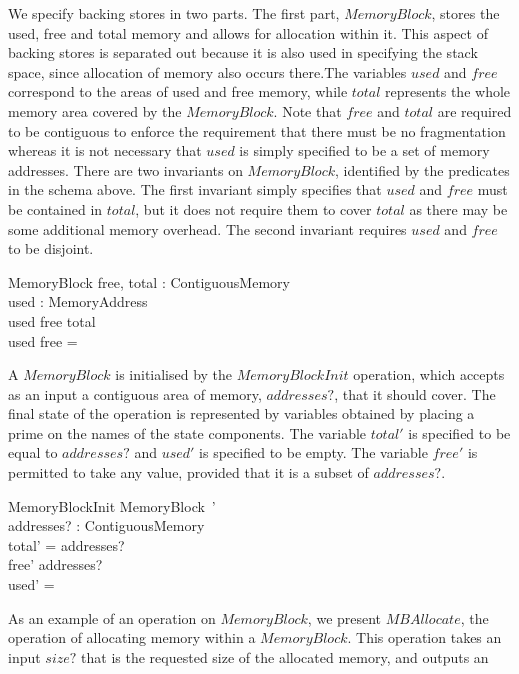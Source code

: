 \documentclass[a4paper,10pt]{article}
\begin{document}
We specify backing stores in two parts. The first part, $MemoryBlock$, stores
the used, free and total memory and allows for allocation within it. This aspect
of backing stores is separated out because it is also used in specifying the
stack space, since allocation of memory also occurs there.The variables $used$
and $free$ correspond to the areas of used and free memory, while $total$
represents the whole memory area covered by the $MemoryBlock$. Note that $free$
and $total$ are required to be contiguous to enforce the requirement that there
must be no fragmentation whereas it is not necessary that $used$ is simply
specified to be a set of memory addresses. There are two invariants on
$MemoryBlock$, identified by the predicates in the schema above. The first
invariant simply specifies that $used$ and $free$ must be contained in $total$,
but it does not require them to cover $total$ as there may be some additional
memory overhead. The second invariant requires $used$ and $free$ to be disjoint.
%
\begin{schema}{MemoryBlock}
  free, total : ContiguousMemory \\
  used : \power MemoryAddress \\
\where
  used \cup free \subseteq total \\
  used \cap free = \emptyset \\
\end{schema}
%
A $MemoryBlock$ is initialised by the $MemoryBlockInit$ operation, which accepts
as an input a contiguous area of memory, $addresses?$, that it should cover. The
final state of the operation is represented by variables obtained by placing a
prime on the names of the state components. The variable $total'$ is specified
to be equal to $addresses?$ and $used'$ is specified to be empty. The variable
$free'$ is permitted to take any value, provided that it is a subset of
$addresses?$.
%
\begin{schema}{MemoryBlockInit}
  MemoryBlock~' \\
  addresses? : ContiguousMemory \\
\where
  total' = addresses? \\
  free' \subseteq addresses? \\
  used' = \emptyset \\
\end{schema}
%
As an example of an operation on $MemoryBlock$, we present $MBAllocate$, the
operation of allocating memory within a $MemoryBlock$. This operation takes an
input $size?$ that is the requested size of the allocated memory, and outputs an
\end{document}
